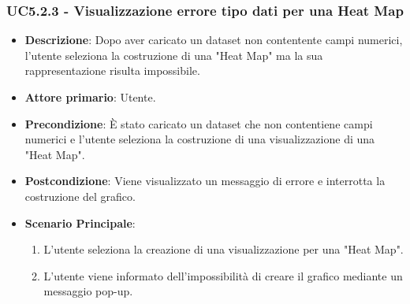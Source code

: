 \subsubsection{UC5.2.3 - Visualizzazione errore tipo dati per una Heat Map}
\label{subsec:uc5.1.2}
\begin{itemize}
    \item \textbf{Descrizione}: Dopo aver caricato un dataset non contentente campi numerici, 
                                l’utente seleziona la costruzione di una "Heat Map" ma la sua rappresentazione risulta impossibile.

    \item \textbf{Attore primario}: Utente.
    
    \item \textbf{Precondizione}:   È stato caricato un dataset che non contentiene campi numerici e l’utente 
                                    seleziona la costruzione di una visualizzazione di una "Heat Map".

    \item \textbf{Postcondizione}:  Viene visualizzato un messaggio di errore e interrotta la costruzione del grafico.
    
    \item \textbf{Scenario Principale}: 
    \begin{enumerate}
        \item L'utente seleziona la creazione di una visualizzazione per una "Heat Map".
        \item L'utente viene informato dell'impossibilità di creare il grafico mediante un messaggio pop-up.
    \end{enumerate}
\end{itemize}